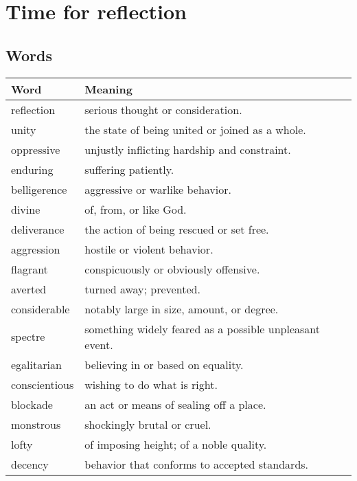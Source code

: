 \documentclass{article}%
\begin{document}
%
\normalsize%
\section{Time for reflection}%
\label{sec:Timeforreflection}%
\subsection{Words}%
\label{subsec:Words}%
\begin{tabular}{ll}%
Word&Meaning\\%
\hline%
reflection&serious thought or consideration.\\%
unity&the state of being united or joined as a whole.\\%
oppressive&unjustly inflicting hardship and constraint.\\%
enduring&suffering patiently.\\%
belligerence&aggressive or warlike behavior.\\%
divine&of, from, or like God.\\%
deliverance&the action of being rescued or set free.\\%
aggression&hostile or violent behavior.\\%
flagrant&conspicuously or obviously offensive.\\%
averted&turned away; prevented.\\%
considerable&notably large in size, amount, or degree.\\%
spectre&something widely feared as a possible unpleasant event.\\%
egalitarian&believing in or based on equality.\\%
conscientious&wishing to do what is right.\\%
blockade&an act or means of sealing off a place.\\%
monstrous&shockingly brutal or cruel.\\%
lofty&of imposing height; of a noble quality.\\%
decency&behavior that conforms to accepted standards.\\%
\end{tabular}

%
\end{document}
